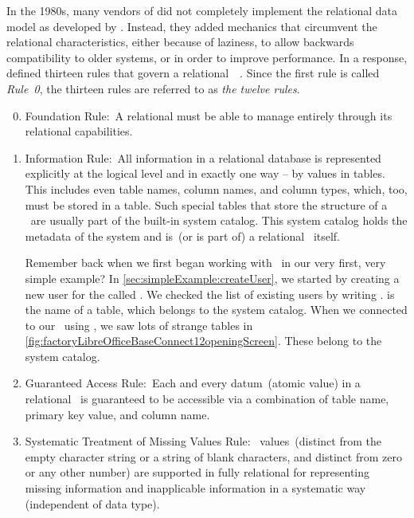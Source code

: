 %
%
In the 1980s, many vendors of  did not completely implement the relational data model as developed by \citeauthor{C1985IYDRR}.
Instead, they added mechanics that circumvent the relational characteristics, either because of laziness, to allow backwards compatibility to older systems, or in order to improve performance.
In a response, \citeauthor{C1985IYDRR} defined thirteen rules that govern a relational~~\cite{C1985IYDRR,C1986AESFDBMSTACTBR,S2024D:LDMRMRA,SP2002STYSI2D,SPMP1998SI2TDDASVEI12T}.
Since the first rule is called \emph{Rule~0}, the thirteen rules are referred to as \emph{the twelve rules}.%
%
\begin{enumerate}%
\setcounter{enumi}{-1}%
%
\item Foundation Rule:~A relational  must be able to manage  entirely through its relational capabilities.%
%
\item Information Rule:~All information in a relational database is represented explicitly at the logical level and in exactly one way -- by values in tables.
This includes even table names, column names, and column types, which, too, must be stored in a table.
Such special tables that store the structure of a \db\ are usually part of the built-in system catalog.
This system catalog holds the metadata of the system and is~(or is part of) a relational \db\ itself.

Remember back when we first began working with \postgresql\ in our very first, very simple example?
In \cref{sec:simpleExample:createUser}, we started by creating a new user for the  called .
We checked the list of existing users by writing .
 is the name of a table, which belongs to the system catalog.
When we connected to our \db\ using \libreofficeBase, we saw lots of strange tables in \cref{fig:factoryLibreOfficeBaseConnect12openingScreen}.
These belong to the system catalog.%
%
\item Guaranteed Access Rule:~Each and every datum~(atomic value) in a relational \db\ is guaranteed to be accessible via a combination of table name, primary key value, and column name.%
%
\item Systematic Treatment of Missing Values Rule:~ values~(distinct from the empty character string or a string of blank characters, and distinct from zero or any other number) are supported in fully relational  for representing missing information and inapplicable information in a systematic way (independent of data type).


\end{enumerate}
